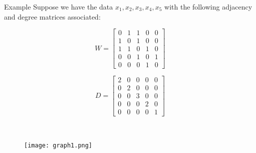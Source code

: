 \documentclass{beamer}
\begin{document}
\begin{frame}{Example}
Suppose we have the data $x_1,x_2,x_3,x_4,x_5$ with the following adjacency and degree matrices associated:
\begin{minipage}[t]{0.4\textwidth}
$$ W= \begin{bmatrix}
0 & 1 & 1 & 0 & 0 \\
1 & 0 & 1 & 0 & 0 \\
1 & 1 & 0 & 1 & 0 \\
0 & 0 & 1 & 0 & 1 \\
0 & 0 & 0 & 1 & 0 
\end{bmatrix}  $$
\end{minipage}
        \hfill
\begin{minipage}[t]{0.4\textwidth}
$$ D= \begin{bmatrix}
2 & 0 & 0 & 0 & 0 \\
0 & 2 & 0 & 0 & 0 \\
0 & 0 & 3 & 0 & 0 \\
0 & 0 & 0 & 2 & 0 \\
0 & 0 & 0 & 0 & 1 
\end{bmatrix}  $$
\end{minipage}
\\
\begin{figure}
        \centering
        \texttt{[image: graph1.png]}
        \label{fig:enter-label}
\end{figure}
\end{frame}
\end{document}
